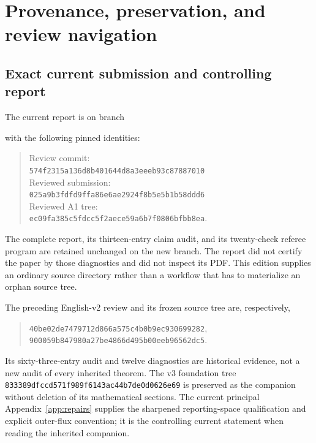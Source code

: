 \section{Provenance, preservation, and review navigation}\label{app:provenance}
\subsection{Exact current submission and controlling report}
The current report is on branch
\begin{quote}\small
{}
\end{quote}
with the following pinned identities:
\begin{quote}\small
Review commit: \\ \texttt{574f2315a136d8b401644d8a3eeeb93c87887010}\\
Reviewed submission: \\ \texttt{025a9b3fdfd9ffa86e6ae2924f8b5e5b1b58ddd6}\\
Reviewed A1 tree: \\ \texttt{ec09fa385c5fdcc5f2aece59a6b7f0806bfbb8ea}.
\end{quote}
The complete report, its thirteen-entry claim audit, and its twenty-check
referee program are retained unchanged on the new branch. The report did
not certify the paper by those diagnostics and did not inspect its PDF.
This edition supplies an ordinary source directory rather than a workflow
that has to materialize an orphan source tree.

The preceding English-v2 review and its frozen source tree are, respectively,
\begin{quote}\small
\texttt{40be02de7479712d866a575c4b0b9ec930699282},\\
\texttt{900059b847980a27be4866d495b00eeb96562dc5}.
\end{quote} Its sixty-three-entry audit
and twelve diagnostics are historical evidence, not a new audit of every
inherited theorem. The v3 foundation tree
\texttt{833389dfccd571f989f6143ac44b7de0d0626e69} is preserved as the
 companion without deletion of its mathematical sections.
The current principal Appendix~\ref{app:repairs} supplies the sharpened
reporting-space qualification and explicit outer-flux convention; it is
the controlling current statement when reading the inherited companion.

